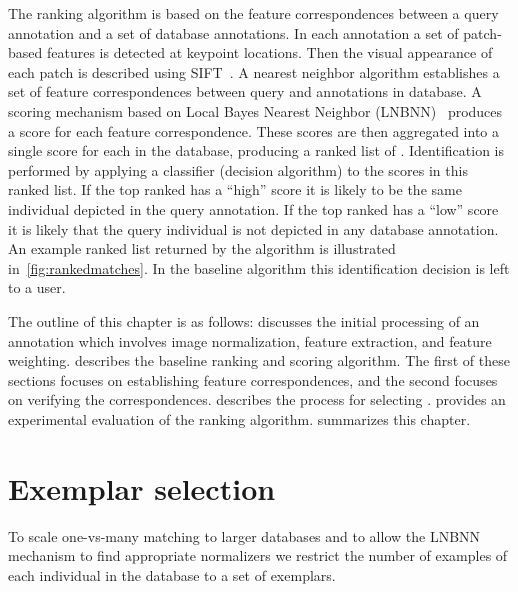     The ranking algorithm is based on the feature correspondences between a query annotation and a set of database
    annotations. In each annotation a set of patch-based features is detected at keypoint locations. Then the
    visual appearance of each patch is described using SIFT~\cite{lowe_distinctive_2004}. A nearest neighbor
    algorithm establishes a set of feature correspondences between query and annotations in database. A scoring
    mechanism based on Local \Naive{} Bayes Nearest Neighbor (LNBNN)~\cite{mccann_local_2012} produces a score for
    each feature correspondence. These scores are then aggregated into a single score for each \name{} in the
    database, producing a ranked list of \names{}. Identification is performed by applying a classifier (decision
    algorithm) to the scores in this ranked list. If the top ranked \name{} has a ``high'' score it is likely to be
    the same individual depicted in the query annotation. If the top ranked \name{} has a ``low'' score it is
    likely that the query individual is not depicted in any database annotation. An example ranked list returned by
    the algorithm is illustrated in~\cref{fig:rankedmatches}. In the baseline algorithm this identification
    decision is left to a user.

    The outline of this chapter is as follows:  discusses the initial processing of an
    annotation which involves image normalization, feature extraction, and feature weighting.
     describes the baseline ranking and scoring algorithm. The first of these
    sections focuses on establishing feature correspondences, and the second focuses on verifying the
    correspondences.  describes the process for selecting \exemplars{}.
     provides an experimental evaluation of the ranking algorithm.
     summarizes this chapter.

    \rankedmatches{}






\section{Exemplar selection}\label{sec:exempselect}
    To scale one-vs-many matching to larger databases and to allow the LNBNN mechanism to find appropriate
    normalizers we restrict the number of examples of each individual in the database to a set of exemplars.

